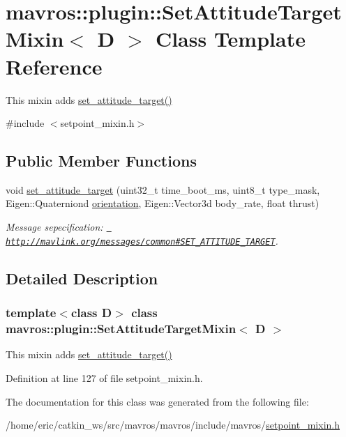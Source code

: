 \hypertarget{classmavros_1_1plugin_1_1SetAttitudeTargetMixin}{}\section{mavros\+::plugin\+::Set\+Attitude\+Target\+Mixin$<$ D $>$ Class Template Reference}
\label{classmavros_1_1plugin_1_1SetAttitudeTargetMixin}


This mixin adds \mbox{\hyperlink{group__plugin_gac84714c4a377cd9eeef8ead08b0e8bc5}{set\+\_\+attitude\+\_\+target()}}  




{\ttfamily \#include $<$setpoint\+\_\+mixin.\+h$>$}

\subsection*{Public Member Functions}
\begin{DoxyCompactItemize}
\item 
void \mbox{\hyperlink{group__plugin_gac84714c4a377cd9eeef8ead08b0e8bc5}{set\+\_\+attitude\+\_\+target}} (uint32\+\_\+t time\+\_\+boot\+\_\+ms, uint8\+\_\+t type\+\_\+mask, Eigen\+::\+Quaterniond \mbox{\hyperlink{structorientation}{orientation}}, Eigen\+::\+Vector3d body\+\_\+rate, float thrust)
\begin{DoxyCompactList}\small\item\em Message sepecification\+: {\ttfamily \href{http://mavlink.org/messages/common\#SET_ATTITUDE_TARGET}{\texttt{ http\+://mavlink.\+org/messages/common\#\+S\+E\+T\+\_\+\+A\+T\+T\+I\+T\+U\+D\+E\+\_\+\+T\+A\+R\+G\+ET}}}. \end{DoxyCompactList}\end{DoxyCompactItemize}


\subsection{Detailed Description}
\subsubsection*{template$<$class D$>$\newline
class mavros\+::plugin\+::\+Set\+Attitude\+Target\+Mixin$<$ D $>$}

This mixin adds \mbox{\hyperlink{group__plugin_gac84714c4a377cd9eeef8ead08b0e8bc5}{set\+\_\+attitude\+\_\+target()}} 

Definition at line 127 of file setpoint\+\_\+mixin.\+h.



The documentation for this class was generated from the following file\+:\begin{DoxyCompactItemize}
\item 
/home/eric/catkin\+\_\+ws/src/mavros/mavros/include/mavros/\mbox{\hyperlink{setpoint__mixin_8h}{setpoint\+\_\+mixin.\+h}}\end{DoxyCompactItemize}
